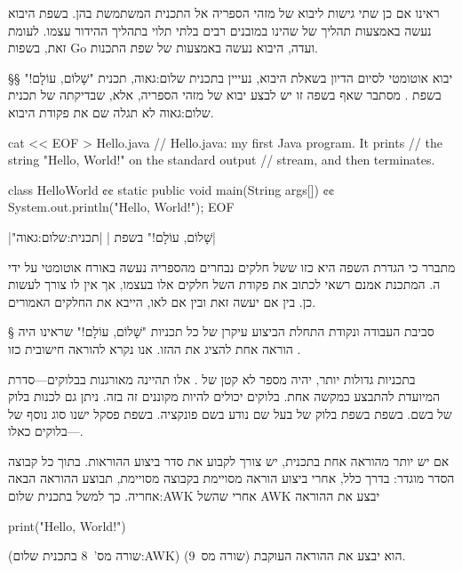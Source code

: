 ראינו אם כן שתי גישות ליבוא של מזהי הספריה אל התכנית המשתמשת בהן. בשפת 
היבוא נעשה באמצעות תהליך של  שהינו במובנים רבים בלתי תלוי
בתהליך ההידור עצמו. לעומת זאת, בשפות Go ועדה, היבוא נעשה באמצעות  של שפת התכנות.

§§ יבוא אוטומטי
לסיום הדיון בשאלת היבוא, נעייין ב תכנית שלום:גאוה, תכנית "שָׁלוֹם, עוֹלָם!"
בשפת . מסתבר שאף בשפה זו יש לבצע יבוא של מזהי הספריה, אלא, שבדיקתה של
 תכנית שלום:גאוה לא תגלה שם את פקודת היבוא.

\begin{תכנית}
\bash
cat << EOF > Hello.java
// Hello.java: my first Java program. It prints
// the string "Hello, World!" on the standard output
// stream, and then terminates.

class HelloWorld {¢¢
  static public void main(String args[]) {¢¢
    System.out.println("Hello, World!");
  }
}
EOF
\END
\setLTR

\setRTL
{}|"שָׁלוֹם, עוֹלָם!" בשפת |
|תכנית:שלום:גאוה|
\end{תכנית}

מתברר כי הגדרת השפה היא כזו ש של חלקים נבחרים מהספריה נעשה באורח אוטומטי
    על ידי ה. המתכנת אמנם רשאי לכתוב את פקודת ה של חלקים אלו בעצמו,
    אך אין לו צורך לעשות כן. בין אם יעשה זאת ובין אם לאו, ה ייבא את
    החלקים האמורים.

    § סביבת העבודה ונקודת התחלת הביצוע
    עיקרן של כל תכניות "שָׁלוֹם, עוֹלָם!" שראינו היה הוראה אחת להציג את ה הזו.
    אנו נקרא להוראה חישובית כזו .

    בתכניות גדולות יותר, יהיה מספר לא קטן של .  אלו תהיינה מאורגנות
    בבלוקים---סדרת  המיועדת להתבצע כמקשה אחת. בלוקים יכולים להיות מקוננים
    זה בזה. ניתן גם לכנות בלוק של  בשם. בשפת בשפת  בלוק של  בעל
שם נודע בשם פונקציה. בשפת פסקל ישנו סוג נוסף של בלוקים כאלו---.

אם יש יותר מהוראה אחת בתכנית, יש צורך לקבוע את סדר ביצוע ההוראות. בתוך כל
קבוצה הסדר מוגדר: בדרך כלל, אחרי ביצוע הוראה מסויימת בקבוצה מסויימת, תבוצע
ההוראה הבאה אחריה. כך למשל ב תכנית שלום:AWK אחרי שה של AWK יבצע את
ההוראה
\begin{קוד}

\begin{CPP}
  print("Hello, World!")
\end{CPP}
\end{קוד}
(שורה מס'~8 ב תכנית שלום:AWK) הוא יבצע את ההוראה העוקבת 
(שורה מס~9).

